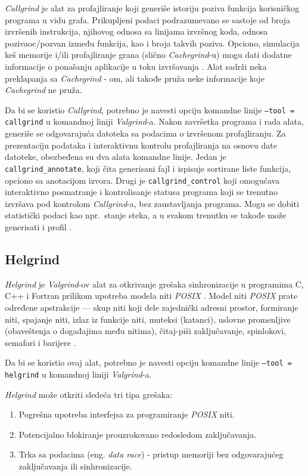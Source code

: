 \documentclass[12pt,oneside]{memoir}
\theoremstyle{plain}
\theoremstyle{definition}
\begin{document}
\textit{Callgrind} je alat za profajliranje koji generiše istoriju poziva funkcija korisničkog programa u vidu grafa. Prikupljeni podaci podrazumevano se sastoje od broja izvršenih instrukcija, njihovog odnosa sa linijama izvršnog koda, odnosa pozivaoc/pozvan između funkcija, kao i broja takvih poziva. Opciono, simulacija keš memorije i/ili profajliranje grana (slično \textit{Cachegrind}-u) mogu dati dodatne informacije o ponašanju aplikacije u toku izvršavanja \cite{Callgrind}. Alat sadrži neka preklapanja sa \textit{Cachegrind} - om, ali takođe pruža neke informacije koje \textit{Cachegrind} ne pruža.

Da bi se koristio \textit{Callgrind}, potrebno je navesti opciju komandne linije \texttt{--tool = callgrind} u komandnoj liniji \textit{Valgrind}-a. Nakon završetka programa i rada alata, generiše se odgovarajuća datoteka sa podacima o izvršenom profajliranju. Za prezentaciju podataka i interaktivnu kontrolu profajliranja na osnovu date datoteke, obezbeđena su dva alata komandne linije. Jedan je \texttt{callgrind\_annotate}, koji čita generisani fajl i ispisuje sortirane liste funkcija, opciono sa anotacijom izvora. Drugi je \texttt{callgrind\_control} koji omogućava interaktivno posmatranje i kontrolisanje statusa programa koji se trenutno izvršava pod kontrolom \textit{Callgrind}-a, bez zaustavljanja programa. Mogu se dobiti statistički podaci kao npr.~stanje steka, a u svakom trenutku se takođe može generisati i profil \cite{Callgrind}. 

\subsection{Helgrind}

\textit{Helgrind} je \textit{Valgrind}-ov alat za otkrivanje grešaka sinhronizacije u programima C, C++ i Fortran prilikom upotreba modela niti \textit{POSIX} \cite{Helgrind}. Model niti \textit{POSIX} prate određene apstrakcije --- skup niti koji dele zajednički adresni prostor, formiranje niti, spajanje niti, izlaz iz funkcije niti, muteksi (katanci), uslovne promenljive (obaveštenja o događajima među nitima), čitaj-piši zaključavanje, spinlokovi, semafori i barijere \cite{Helgrind}. 

Da bi se koristio ovaj alat, potrebno je navesti opciju komandne linije \texttt{--tool = helgrind} u komandnoj liniji \textit{Valgrind}-a.

\textit{Helgrind} može otkriti sledeća tri tipa grešaka:
\begin{enumerate}
\item Pogrešna upotreba interfejsa za programiranje \textit{POSIX} niti.
\item Potencijalno blokiranje prouzrokovano redosledom zaključavanja.
\item Trka sa podacima (eng. \textit{data race})  - pristup memoriji bez odgovarajućeg zaključavanja ili sinhronizacije.
\end{enumerate}
\end{document}
